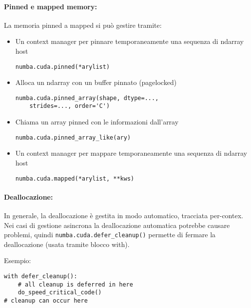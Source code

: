\paragraph{Pinned e mapped memory:} La memoria pinned a mapped si può gestire tramite:
\begin{itemize}
	\item Un context manager per pinnare temporaneamente una sequenza di ndarray host
	\begin{verbatim}
numba.cuda.pinned(*arylist)
	\end{verbatim}
	
	\item Alloca un ndarray con un buffer pinnato (pagelocked)
	\begin{verbatim}
numba.cuda.pinned_array(shape, dtype=..., 
    strides=..., order='C')
	\end{verbatim}
	
	\item Chiama un array pinned con le informazioni dall'array 
	\begin{verbatim}
numba.cuda.pinned_array_like(ary)
	\end{verbatim}
	
	\item Un context manager  per mappare temporaneamente una sequenza di ndarray host
	\begin{verbatim}
numba.cuda.mapped(*arylist, **kws)
	\end{verbatim}
\end{itemize}

\paragraph{Deallocazione:} In generale, la deallocazione è gestita in modo automatico, tracciata per-contex. Nei casi di gestione asincrona la deallocazione automatica potrebbe causare problemi, quindi \texttt{numba.cuda.defer\_cleanup()} permette di fermare la deallocazione (usata tramite blocco with). 

Esempio:
\begin{verbatim}
with defer_cleanup():
    # all cleanup is deferred in here
    do_speed_critical_code()
# cleanup can occur here
\end{verbatim}

